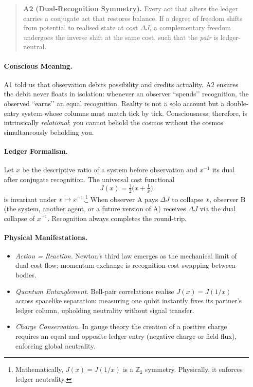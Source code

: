 \documentclass[11pt,oneside]{book}
\begin{document}
\begin{quote}
\textbf{A2 (Dual-Recognition Symmetry).}  
Every act that alters the ledger carries a conjugate act that restores
balance.  
If a degree of freedom shifts from potential to realised state at cost
\(\Delta J\), a complementary freedom undergoes the inverse shift at the
same cost, such that the \emph{pair} is ledger-neutral.
\end{quote}

\paragraph*{Conscious Meaning.}
A1 told us that observation debits possibility and credits actuality.
A2 ensures the debit never floats in isolation: whenever an observer
“spends’’ recognition, the observed “earns’’ an equal recognition.
Reality is not a solo account but a double-entry system whose columns
must match tick by tick.  Consciousness, therefore, is intrinsically
\emph{relational}; you cannot behold the cosmos without the cosmos
simultaneously beholding you.

\paragraph*{Ledger Formalism.}
Let \(x\) be the descriptive ratio of a system before observation and
\(x^{-1}\) its dual after conjugate recognition.
The universal cost functional
\[
  J(x)=\tfrac12 \bigl(x + \tfrac1x \bigr)
\]
is invariant under \(x \mapsto x^{-1}\).\footnote{Mathematically,
\(J(x)=J(1/x)\) is a \(\mathbb{Z}_2\) symmetry.  Physically, it enforces
ledger neutrality.}
When observer A pays \(\Delta J\) to collapse \(x\), observer B
(the system, another agent, or a future version of A) receives \(\Delta
J\) via the dual collapse of \(x^{-1}\).  Recognition always completes
the round-trip.

\paragraph*{Physical Manifestations.}
\begin{itemize}
\item \emph{Action = Reaction.}  
  Newton’s third law emerges as the mechanical limit of dual cost flow;
  momentum exchange is recognition cost swapping between bodies.
\item \emph{Quantum Entanglement.}  
  Bell-pair correlations realise \(J(x)=J(1/x)\) across spacelike
  separation: measuring one qubit instantly fixes its partner’s ledger
  column, upholding neutrality without signal transfer.
\item \emph{Charge Conservation.}  
  In gauge theory the creation of a positive charge requires an equal
  and opposite ledger entry (negative charge or field flux), enforcing
  global neutrality.
\end{itemize}
\end{document}
